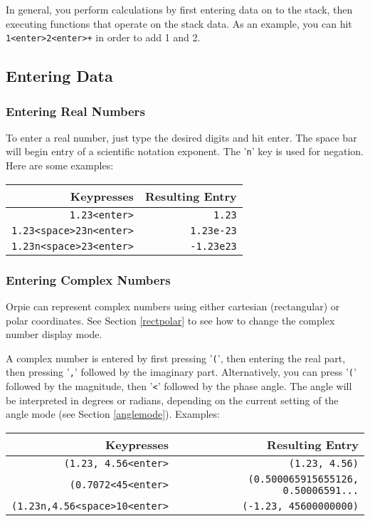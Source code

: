 \documentclass[11pt,notitlepage]{article}
\begin{document}
In general, you perform calculations by first entering data on to the stack,
then executing functions that operate on the stack data.  As an example, you can
hit {\tt 1<enter>2<enter>+} in order to add 1 and 2.

\subsection{Entering Data}
\subsubsection{Entering Real Numbers}
To enter a real number, just type the desired digits and hit enter.  The space
bar will begin entry of a scientific notation exponent.  The '{\tt n}' key is used
for negation.  Here are some examples:
\begin{center}
   \begin{tabular}[t]{|r|r|}
      \hline Keypresses & Resulting Entry \\
      \hline
      {\tt 1.23<enter>} & {\tt 1.23} \\
      {\tt 1.23<space>23n<enter>} & {\tt 1.23e-23} \\
      {\tt 1.23n<space>23<enter>} & {\tt -1.23e23} \\
      \hline
   \end{tabular}
\end{center}

\subsubsection{Entering Complex Numbers}
Orpie can represent complex numbers using either cartesian (rectangular) or
polar coordinates.  See Section \ref{rectpolar} to see how to change the
complex number display mode.

A complex number is entered by first pressing '{\tt (}', then entering the real
part, then pressing '{\tt ,}' followed by the imaginary part.  Alternatively, you
can press '{\tt (}' followed by the magnitude, then '{\tt <}' followed by the
phase angle.  The angle will be interpreted in degrees or radians, depending on
the current setting of the angle mode (see Section \ref{anglemode}).  Examples:
\begin{center}
   \begin{tabular}[t]{|r|r|}
      \hline Keypresses & Resulting Entry \\
      \hline
      {\tt (1.23, 4.56<enter>} & {\tt (1.23, 4.56)} \\
      {\tt (0.7072<45<enter>} & {\tt (0.500065915655126, 0.50006591...} \\
      {\tt (1.23n,4.56<space>10<enter>} & {\tt (-1.23, 45600000000)} \\
      \hline
   \end{tabular}
\end{center}
\end{document}
